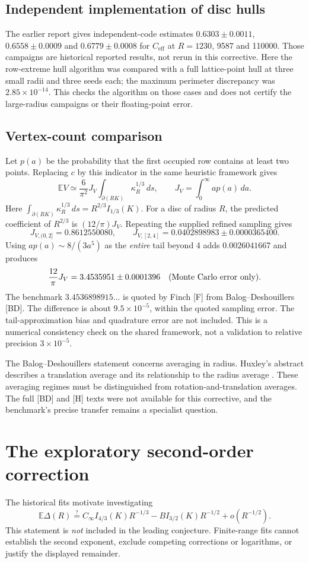 \documentclass[11pt,a4paper]{article}
\newcommand{\E}{\mathbb E}
\begin{document}
\subsection{Independent implementation of disc hulls}
The earlier report gives independent-code estimates $0.6303\pm0.0011$, $0.6558\pm0.0009$ and $0.6779\pm0.0008$ for $C_{\mathrm{eff}}$ at $R=1230$, 9587 and 110000. Those campaigns are historical reported results, not rerun in this corrective. Here the row-extreme hull algorithm was compared with a full lattice-point hull at three small radii and three seeds each; the maximum perimeter discrepancy was $2.85\times10^{-14}$. This checks the algorithm on those cases and does not certify the large-radius campaigns or their floating-point error.

\subsection{Vertex-count comparison}
Let $p(a)$ be the probability that the first occupied row contains at least two points. Replacing $c$ by this indicator in the same heuristic framework gives
\[
 \E V\simeq\frac6{\pi^2}J_V\int_{\partial(RK)}\kappa_R^{1/3}\,ds,
 \qquad J_V=\int_0^\infty ap(a)\,da.
\]
Here $\int_{\partial(RK)}\kappa_R^{1/3}\,ds=R^{2/3}I_{1/3}(K)$. For a disc of radius $R$, the predicted coefficient of $R^{2/3}$ is $(12/\pi)J_V$. Repeating the supplied refined sampling gives
\[
 J_{V,(0,2]}=0.8612550080,\qquad
 J_{V,[2,4]}=0.0402898983\pm0.0000365400.
\]
Using $ap(a)\sim8/(3a^5)$ as the \emph{entire} tail beyond 4 adds $0.0026041667$ and produces
\[
 \frac{12}{\pi}J_V=3.4535951\pm0.0001396
 \quad\hbox{(Monte Carlo error only).}
\]
The benchmark $3.4536898915\ldots$ is quoted by Finch [F] from Balog--Deshouillers [BD]. The difference is about $9.5\times10^{-5}$, within the quoted sampling error. The tail-approximation bias and quadrature error are not included. This is a numerical consistency check on the shared framework, not a validation to relative precision $3\times10^{-5}$.

The Balog--Deshouillers statement concerns averaging in radius. Huxley's abstract describes a translation average and its relationship to the radius average \cite{H}. These averaging regimes must be distinguished from rotation-and-translation averages. The full [BD] and [H] texts were not available for this corrective, and the benchmark's precise transfer remains a specialist question.

\section{The exploratory second-order correction}\label{sec:second}
The historical fits motivate investigating
\[
 \E\Delta(R)\stackrel{?}{=}
 C_\infty I_{4/3}(K)R^{-1/3}
 -B I_{3/2}(K)R^{-1/2}+o(R^{-1/2}).
\]
This statement is \emph{not} included in the leading conjecture. Finite-range fits cannot establish the second exponent, exclude competing corrections or logarithms, or justify the displayed remainder.
\end{document}
